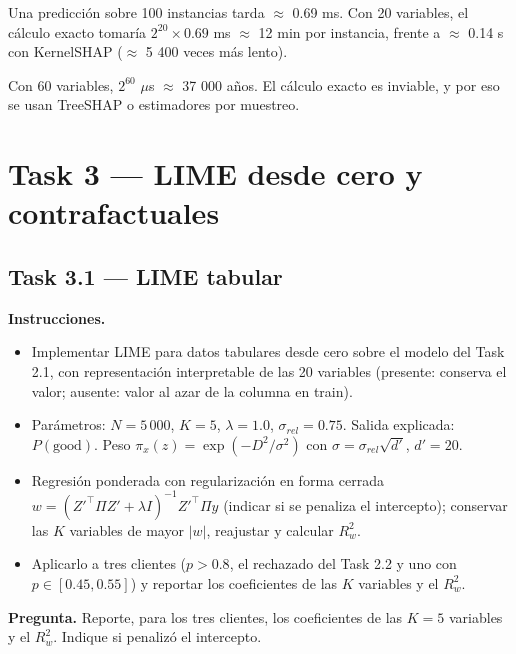 \documentclass[11pt]{article}
\renewcommand{\_}{\textunderscore\allowbreak{}}
\begin{document}
Una predicción sobre 100 instancias tarda \(\approx\) 0.69 ms. Con 20 variables, el cálculo exacto tomaría \(2^{20} \times 0.69\) ms \(\approx\) 12 min por instancia, frente a \(\approx\) 0.14 s con KernelSHAP (\(\approx\) 5 400 veces más lento).

Con 60 variables, \(2^{60}\) \(\mu\)s \(\approx\) 37 000 años. El cálculo exacto es inviable, y por eso se usan TreeSHAP o estimadores por muestreo.

\newpage
\section*{Task 3 --- LIME desde cero y contrafactuales}

\subsection*{Task 3.1 --- LIME tabular}
\textbf{Instrucciones.}
\begin{itemize}
  \item Implementar LIME para datos tabulares desde cero sobre el modelo del Task 2.1, con representación interpretable de las 20 variables (presente: conserva el valor; ausente: valor al azar de la columna en train).
  \item Parámetros: $N=5\,000$, $K=5$, $\lambda=1.0$, $\sigma_{rel}=0.75$. Salida explicada: $P(\text{good})$. Peso $\pi_x(z)=\exp(-D^2/\sigma^2)$ con $\sigma=\sigma_{rel}\sqrt{d'}$, $d'=20$.
  \item Regresión ponderada con regularización en forma cerrada $w=(Z'^\top\Pi Z'+\lambda I)^{-1}Z'^\top\Pi y$ (indicar si se penaliza el intercepto); conservar las $K$ variables de mayor $|w|$, reajustar y calcular $R^2_w$.
  \item Aplicarlo a tres clientes ($p>0.8$, el rechazado del Task 2.2 y uno con $p\in[0.45,0.55]$) y reportar los coeficientes de las $K$ variables y el $R^2_w$.
\end{itemize}

\begin{tcolorbox}[colback=yellow!12, colframe=orange!70!black, boxrule=0.5pt, left=4pt, right=4pt]
\textbf{Pregunta.} Reporte, para los tres clientes, los coeficientes de las \(K=5\) variables y el \(R^2_w\). Indique si penalizó el intercepto.
\end{tcolorbox}
\end{document}

